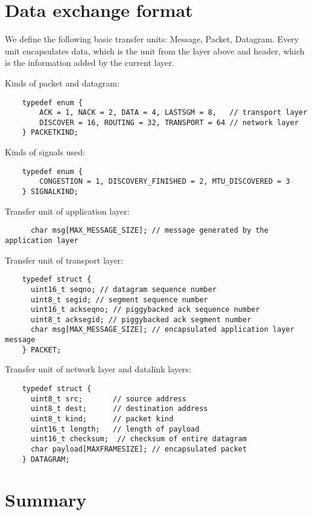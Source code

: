 \documentclass[11pt,a4paper,oneside]{report}
\begin{document}
\section*{Data exchange format}

We define the following basic transfer units: Message, Packet, Datagram.
Every unit encapsulates data, which is the unit from the layer above and header, 
which is the information added by the current layer. 

Kinds of packet and datagram:

    \begin{lstlisting}
    typedef enum {
        ACK = 1, NACK = 2, DATA = 4, LASTSGM = 8,   // transport layer
        DISCOVER = 16, ROUTING = 32, TRANSPORT = 64 // network layer
    } PACKETKIND;
    \end{lstlisting}
    
Kinds of signals used:

    \begin{lstlisting}
    typedef enum {
        CONGESTION = 1, DISCOVERY_FINISHED = 2, MTU_DISCOVERED = 3
    } SIGNALKIND;
    \end{lstlisting}

Transfer unit of application layer:
    \begin{lstlisting}
      char msg[MAX_MESSAGE_SIZE]; // message generated by the application layer
    \end{lstlisting}
  
Transfer unit of transport layer:
       
    \begin{lstlisting}
    typedef struct {
      uint16_t seqno; // datagram sequence number
      uint8_t segid; // segment sequence number
      uint16_t ackseqno; // piggybacked ack sequence number
      uint8_t acksegid; // piggybacked ack segment number
      char msg[MAX_MESSAGE_SIZE]; // encapsulated application layer message
    } PACKET;
    \end{lstlisting}
  
Transfer unit of network layer and datalink layers:   
    
    \begin{lstlisting}
    typedef struct {
      uint8_t src;       // source address
      uint8_t dest;      // destination address
      uint8_t kind;      // packet kind
      uint16_t length;   // length of payload
      uint16_t checksum;  // checksum of entire datagram
      char payload[MAXFRAMESIZE]; // encapsulated packet
    } DATAGRAM;
   \end{lstlisting}
   

\section*{Summary}
\end{document}
